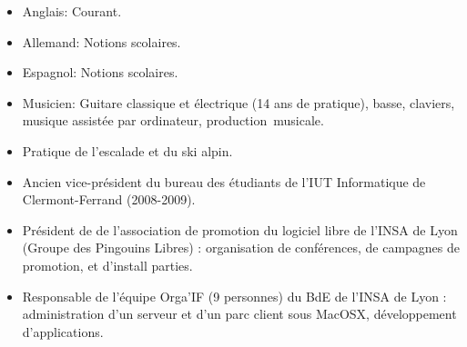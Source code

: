     \begin{itemize}
	\item Anglais: Courant.
	\item Allemand: Notions scolaires.
	\item Espagnol: Notions scolaires.
    \end{itemize}
\begin{itemize}
    \item Musicien: Guitare classique et électrique (14 ans de pratique), basse, claviers, musique assistée par ordinateur, production~musicale.
    \item Pratique de l'escalade et du ski alpin.
    \item Ancien vice-président du bureau des étudiants de l'IUT Informatique de
    Clermont-Ferrand (2008-2009).
    \item Président de de l'association de promotion du logiciel libre de l'INSA de Lyon (Groupe des Pingouins Libres) : organisation de conférences, de campagnes de promotion, et d'install parties.
    \item Responsable de l'équipe Orga'IF (9 personnes) du BdE de l'INSA de Lyon : administration d'un serveur et d'un parc client sous MacOSX, développement d'applications.
\end{itemize}

\vfill


